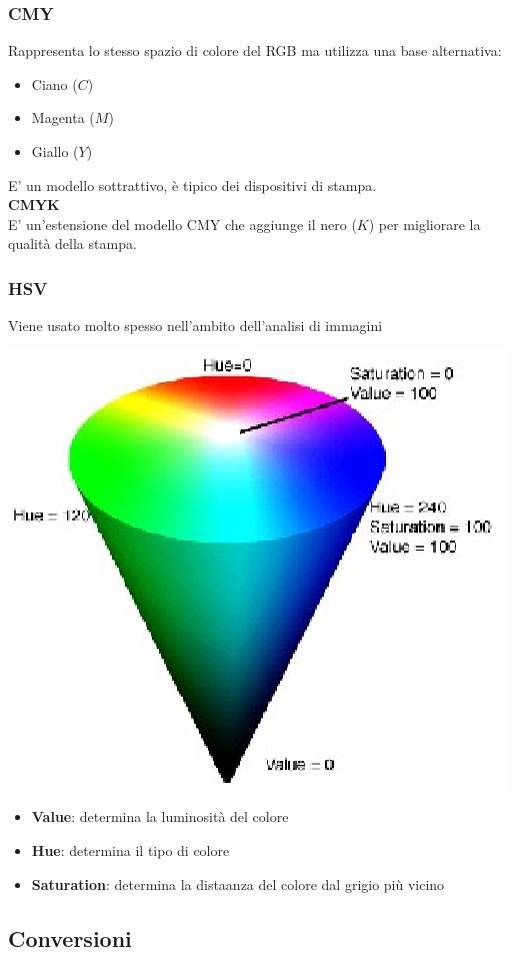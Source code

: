 \documentclass[12pt, a4paper]{report}
\begin{document}
\subsubsection{CMY}
Rappresenta lo stesso spazio di colore del RGB ma utilizza una base alternativa:
\begin{itemize}
    \item Ciano ($C$)
    \item Magenta ($M$)
    \item Giallo ($Y$)
\end{itemize}
E' un modello sottrattivo, è tipico dei dispositivi di stampa.
\\\textbf{CMYK}\\
E' un'estensione del modello CMY che aggiunge il nero ($K$) per migliorare la qualità della stampa.
\subsubsection{HSV}
Viene usato molto spesso nell'ambito dell'analisi di immagini
\begin{center}
    \includegraphics[width=.5\textwidth]{Immagini/hsv.png}
\end{center}
\begin{itemize}
    \item \textbf{Value}: determina la luminosità del colore
    \item \textbf{Hue}: determina il tipo di colore
    \item \textbf{Saturation}: determina la distaanza del colore dal grigio più vicino
\end{itemize}
\subsection{Conversioni}
\end{document}
